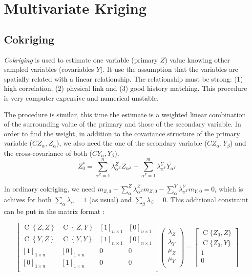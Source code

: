 \documentclass[twocolumn]{article}
\numberwithin{equation}{section}
\begin{document}
\section{Multivariate Kriging}
\subsection{Cokriging}
\emph{Cokriging} is used to estimate one variable (primary $Z$) value knowing other sampled variables (covariables $Y$). It use the assumption that the variables are spatially related with a linear relationship. The relationship must be strong: (1) high correlation, (2) physical link and (3) good history matching. This procedure is very computer expensive and numerical unstable.


The procedure is similar, this time the estimate is a weighted linear combination of the surrounding value of the primary and those of the secondary variable. In order to find the weight, in addition to the covariance structure of the primary variable ($C{Z_\alpha,Z_\alpha}$), we also need the one of the secondary variable ($C{Z_\alpha,Y_\beta}$) and the cross-covariance of both ($C{Y_\alpha,Y_\beta}$).
\begin{equation} \label{eq:cokrig}
	\tilde{Z^*_0} = \sum_{\alpha^Z=1}^n \lambda_{\alpha^Z}^Z \tilde{Z_{\alpha^Z}} + \sum_{\alpha^Y=1}^m \lambda_{\alpha^Y}^Y \tilde{Y_{\alpha^Y}} 
\end{equation}

In ordinary cokriging, we need $m_{Z,0} -\sum_\alpha^Z \lambda_{\alpha^Z}^Z m_{Z,0} - \sum_\alpha^Y \lambda_{\alpha^Y}^Y m_{Y,0} = 0$, which is achives for both $\sum_\alpha \lambda_\alpha = 1$ (as usual) and $\sum_\beta \lambda_\beta = 0$. This additional constraint can be put in the matrix format :

\[
		\begin{bmatrix}
       		\operatorname{C}\left\{Z,Z\right\} 	& \operatorname{C}\left\{Z,Y\right\} 	& [1]_{n\times 1}	& [0]_{n\times 1} 	\\
       		\operatorname{C}\left\{Y,Z\right\}  	& \operatorname{C}\left\{Y,Y\right\}		& [1]_{n\times 1}	& [0]_{n\times 1} 	\\
       		[1]_{1\times n}						& [0]_{1\times n}						& 0		& 0	\\
       		[0]_{1\times n}						& [1]_{1\times n}						& 0		& 0	\\
     	\end{bmatrix}
     	\begin{pmatrix}
       		\lambda_{Z} 	\\
       		\lambda_{Y}	\\
       		\mu_{Z} \\ 
       		\mu_{Y} \\
     	\end{pmatrix}
     	=
     	\begin{bmatrix}
       		\operatorname{C}\{{Z_0,Z}\} 	\\
       		\operatorname{C}\{{Z_0,Y}\}	\\
       		1 	\\
       		0\\
     	\end{bmatrix}
\] 
\end{document}
